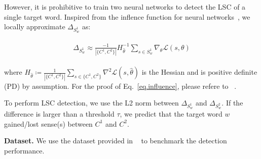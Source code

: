 \documentclass[a4paper]{article}
\theoremstyle{plain}
\theoremstyle{definition}
\begin{document}
However, it is prohibitive to train two neural networks to detect the LSC of a single target word. 
Inspired from the inflence function for neural networks~\cite{classic-influences, pmlr-v70-koh17a}, we locally approximate $\Delta_{S_w^1}$ as:



\begin{align}
\begin{split}
	\Delta_{S_w^1} \approx \frac{-1}{|\{ C^1, C^2 \}|} H^{-1}_{\hat{\theta}} \sum_{s \in S_w^1} \nabla_\theta \mathcal{L}(s, \theta)
	\label{eq.influence}
\end{split}
\end{align}

\noindent where $H_{\hat{\theta}} \coloneqq \frac{1}{|\{ C^1, C^2 \}|} \sum_{s \in \{ C^1, C^2 \}} \nabla^2 \mathcal{L}(s, \hat{\theta})$ is the Hessian and is positive definite (PD) by assumption. 
For the proof of Eq.~\ref{eq.influence}, please refere to ~\cite{pmlr-v70-koh17a}.

To perform LSC detection, we use the L2 norm between $\Delta_{S_w^1}$ and $\Delta_{S_w^2}$. If the difference is larger than a threshold $\tau$, we predict that the target word $w$ gained/lost sense(s) between $C^1$ and $C^2$.


\noindent\textbf{Dataset.} We use the dataset provided in ~\cite{schlechtweg-etal-2020-semeval} to benchmark the detection performance.


\clearpage
\printbibliography
\end{document}

